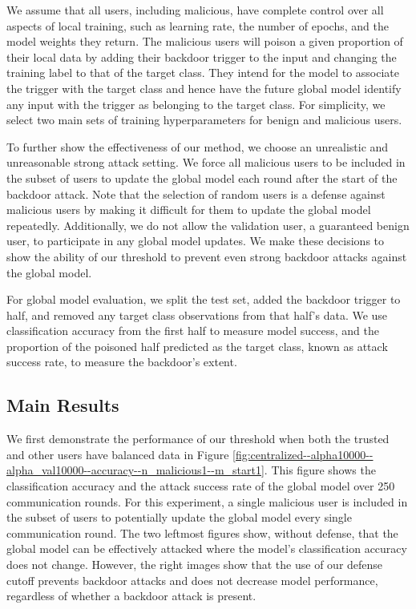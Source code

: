 \documentclass{article} %
\begin{document}
We assume that all users, including malicious, have complete control over all aspects of local training, such as learning rate, the number of epochs, and the model weights they return. The malicious users will poison a given proportion of their local data by adding their backdoor trigger to the input and changing the training label to that of the target class. They intend for the model to associate the trigger with the target class and hence have the future global model identify any input with the trigger as belonging to the target class. For simplicity, we select two main sets of training hyperparameters for benign and malicious users. 

To further show the effectiveness of our method, we choose an unrealistic and unreasonable strong attack setting. We force all malicious users to be included in the subset of users to update the global model each round after the start of the backdoor attack. Note that the selection of random users is a defense against malicious users by making it difficult for them to update the global model repeatedly. Additionally, we do not allow the validation user, a guaranteed benign user, to participate in any global model updates. We make these decisions to show the ability of our threshold to prevent even strong backdoor attacks against the global model. 

For global model evaluation, we split the test set, added the backdoor trigger to half, and removed any target class observations from that half's data. We use classification accuracy from the first half to measure model success, and the proportion of the poisoned half predicted as the target class, known as attack success rate, to measure the backdoor's extent.


%
\subsection{Main Results}
We first demonstrate the performance of our threshold when both the trusted and other users have balanced data in Figure \ref{fig:centralized--alpha10000--alpha_val10000--accuracy--n_malicious1--m_start1}. This figure shows the classification accuracy and the attack success rate of the global model over 250 communication rounds. For this experiment, a single malicious user is included in the subset of users to potentially update the global model every single communication round. The two leftmost figures show, without defense, that the global model can be effectively attacked where the model's classification accuracy does not change. However, the right images show that the use of our defense cutoff prevents backdoor attacks and does not decrease model performance, regardless of whether a backdoor attack is present. 
\end{document}
